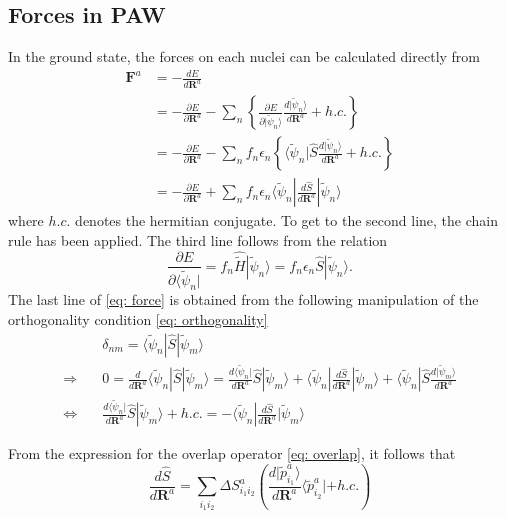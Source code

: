 \documentclass[a4paper]{article}
\newcommand{\f}[1]{\mathbf{#1}}
\newcommand{\s}[1]{\tilde{#1}}
\newcommand{\ws}[1]{\widetilde{#1}}
\newcommand{\h}[1]{\hat{#1}}
\newcommand{\wh}[1]{\widehat{#1}}
\newcommand{\bR}{\mathbf{R}}
\newcommand{\bra}[1]{\langle #1 |}
\newcommand{\ket}[1]{| #1 \rangle}
\begin{document}
\subsection{Forces in PAW}\label{sec: forces}
In the ground state, the forces on each nuclei can be calculated directly from
%
\begin{equation}
  \label{eq: force}
  \begin{split}
    \f{F}^a &= -\frac{dE}{d\bR^a} \\
&= -\frac{\partial E}{\partial \bR^a} - \sum_n\left\{ \frac{\partial E}{\partial \ket{\s{\psi}_n}} \frac{d \ket{\s{\psi}_n}}{d \bR^a} + h.c.\right\}\\
&= -\frac{\partial E}{\partial \bR^a} - \sum_n f_n \epsilon_n \left\{ \bra{\s{\psi}_n}\h{S} \frac{d \ket{\s{\psi}_n}}{d \bR^a} + h.c.\right\}\\
&= -\frac{\partial E}{\partial \bR^a} + \sum_n f_n \epsilon_n \bra{\s{\psi}_n}\frac{d\h{S}}{d\bR^a}\ket{\s{\psi}_n}
  \end{split}
\end{equation}
%
where $h.c.$ denotes the hermitian conjugate. To get to the second
line, the chain rule has been applied. The third line follows from the
relation
%
\begin{equation}
  \frac{\partial E}{\partial \bra{\s{\psi}_n}} = f_n \wh{\ws{H}} \ket{\s{\psi}_n} = f_n \epsilon_n \h{S} \ket{\s{\psi}_n}.
\end{equation}
%
The last line of \ref{eq: force} is obtained from the following
manipulation of the orthogonality condition \ref{eq: orthogonality}
%
\begin{equation}
  \begin{split}
    &\quad \delta_{nm} = \bra{\s{\psi}_n}\h{S}\ket{\s{\psi}_m} \\
    \Rightarrow &\quad 0 = \frac{d}{d\bR^a} \bra{\s{\psi}_n}\h{S}\ket{\s{\psi}_m} = \frac{d\bra{\s{\psi}_n}}{d\bR^a}\h{S}\ket{\s{\psi}_m}  + \bra{\s{\psi}_n}\frac{d\h{S}}{d\bR^a}\ket{\s{\psi}_m} + \bra{\s{\psi}_n}\h{S}\frac{d\ket{\s{\psi}_m}}{d\bR^a}\\
    \Leftrightarrow & \quad \frac{d\bra{\s{\psi}_n}}{d\bR^a}\h{S}\ket{\s{\psi}_m} + h.c. = - \bra{\s{\psi}_n}\frac{d\h{S}}{d\bR^a}\ket{\s{\psi}_m}
  \end{split}
\end{equation}
%
\par From the expression for the overlap operator \ref{eq: overlap},
it follows that
%
\begin{equation}
  \frac{d\h{S}}{d\bR^a} = \sum_{i_1i_2} \Delta S^a_{i_1i_2}\left(\frac{d \ket{\s{p}^a_{i_1}}}{d\bR^a}\bra{\s{p}^a_{i_2}} + h.c. \right)
\end{equation}
\end{document}
